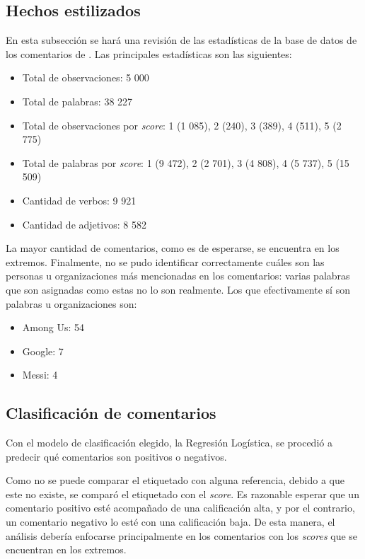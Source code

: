 \subsection{Hechos estilizados}
En esta subsección se hará una revisión de las estadísticas de la base de datos de los comentarios de . Las principales estadísticas son las siguientes:
\begin{itemize}
	\itemsep0em 
	\item Total de observaciones: 5 000
	\item Total de palabras: 38 227
	\item Total de observaciones por \textit{score}: 1 (1 085), 2 (240), 3 (389), 4 (511), 5 (2 775)
	\item Total de palabras por \textit{score}: 1 (9 472), 2 (2 701), 3 (4 808), 4 (5 737), 5 (15 509)
	\item Cantidad de verbos: 9 921
	\item Cantidad de adjetivos: 8 582
\end{itemize}

La mayor cantidad de comentarios, como es de esperarse, se encuentra en los extremos. Finalmente, no se pudo identificar correctamente cuáles son las personas u organizaciones más mencionadas en los comentarios: varias palabras que son asignadas como estas no lo son realmente. Los que efectivamente sí son palabras u organizaciones son:
\begin{itemize}
	\itemsep0em 
	\item Among Us: 54
	\item Google: 7
	\item Messi: 4
\end{itemize}


\subsection{Clasificación de comentarios}
Con el modelo de clasificación elegido, la Regresión Logística, se procedió a predecir qué comentarios son positivos o negativos.

Como no se puede comparar el etiquetado con alguna referencia, debido a que este no existe, se comparó el etiquetado con el \textit{score}. Es razonable esperar que un comentario positivo esté acompañado de una calificación alta, y por el contrario, un comentario negativo lo esté con una calificación baja. De esta manera, el análisis debería enfocarse principalmente en los comentarios con los \textit{scores} que se encuentran en los extremos. 

